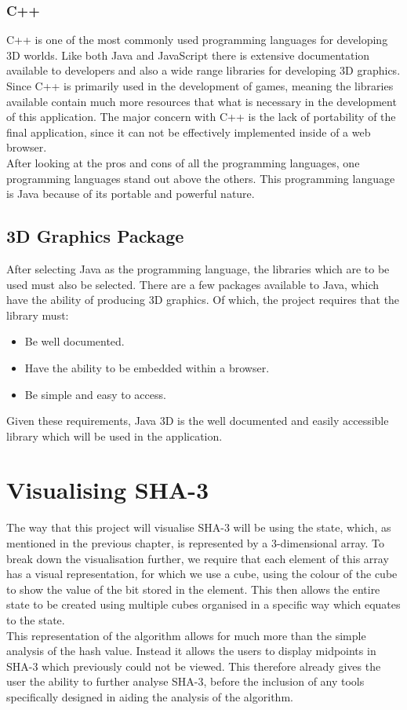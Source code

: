 \subsubsection{C++}
C++ is one of the most commonly used programming languages for developing 3D worlds. Like both Java and JavaScript there is extensive documentation available to developers and also a wide range libraries for developing 3D graphics.
\vspace{5 mm}\\
Since C++ is primarily used in the development of games, meaning the libraries available contain much more resources that what is necessary in the development of this application. The major concern with C++ is the lack of portability of the final application, since it can not be effectively implemented inside of a web browser.
\vspace{5 mm}\\
After looking at the pros and cons of all the programming languages, one programming languages stand out above the others. This programming language is Java because of its portable and powerful nature.
\subsection{3D Graphics Package}
After selecting Java as the programming language, the libraries which are to be used must also be selected. There are a few packages available to Java, which have the ability of producing 3D graphics. Of which, the project requires that the library must:
\begin{itemize}
\item Be well documented.
\item Have the ability to be embedded within a browser.
\item Be simple and easy to access.
\end{itemize}
Given these requirements, Java 3D\cite{Java3dLib} is the well documented and easily accessible library which will be used in the application.
\section{Visualising SHA-3}
 The way that this project will visualise SHA-3 will be using the state, which, as mentioned in the previous chapter, is represented by a 3-dimensional array. To break down the visualisation further, we require that each element of this array has a visual representation, for which we use a cube, using the colour of the cube to show the value of the bit stored in the element. This then allows the entire state to be created using multiple cubes organised in a specific way which equates to the state.
\vspace{5 mm}\\
This representation of the algorithm allows for much more than the simple analysis of the hash value. Instead it allows the users to display midpoints in SHA-3 which previously could not be viewed. This therefore already gives the user the ability to further analyse SHA-3, before the inclusion of any tools specifically designed in aiding the analysis of the algorithm.
